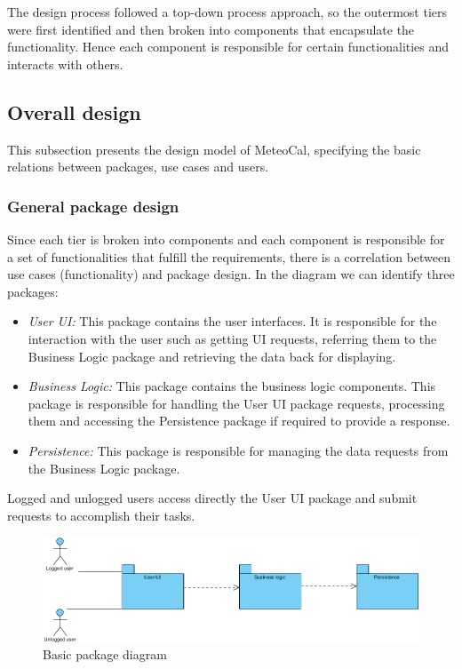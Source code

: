 \documentclass[10pt,a4paper,titlepage]{article}
\begin{document}
The design process followed a top-down process approach, so the outermost tiers were first identified and then broken into components that encapsulate the functionality. Hence each component is responsible for certain functionalities and interacts with others.

\subsection{Overall design}
This subsection presents the design model of MeteoCal, specifying the basic relations between packages, use cases and users.

\subsubsection{General package design}
Since each tier is broken into components and each component is responsible for a set of functionalities that fulfill the requirements, there is a correlation between use cases (functionality) and package design. In the diagram we can identify three packages:
\begin{itemize}
\item \emph{User UI:} This package contains the user interfaces. It is responsible for the interaction with the user such as getting UI requests, referring them to the Business Logic package and retrieving the data back for displaying.
\item \emph{Business Logic:} This package contains the business logic components. This package is responsible for handling the User UI package requests, processing them and accessing the Persistence package if required to provide a response.
\item \emph{Persistence:} This package is responsible for managing the data requests from the Business Logic package.
\end{itemize}

Logged and unlogged users access directly the User UI package and submit requests to accomplish their tasks.

\begin{figure}[h]
\centering
\includegraphics[width=\linewidth]{./images/basic-package}
\caption[Basic package]{Basic package diagram}
\label{fig:basic-package}
\end{figure}
\end{document}

